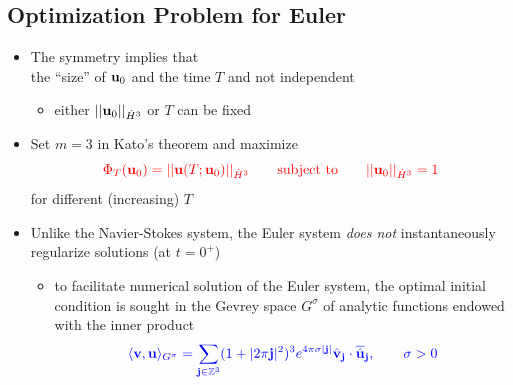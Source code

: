 \documentclass{beamer}
\def\Bmp#1{ \begin{minipage}{#1} }
\def\Emp{ \end{minipage} }
\def\red#1{{\color{red}{ #1 }}}
\def\blue#1{{\color{blue}{ #1 }}}
\def\v{{\bf v}}
\def\x{{\bf x}}
\def\j{{\bf j}}
\def\u{{\bf u}}
\begin{document}
\subsection{Optimization Problem for Euler}
\frame
{
  \hspace*{-0.75cm}
\Bmp{12cm}
\raggedright

\begin{itemize}
\item<1-> The symmetry
  \blue{$\lambda \u_\lambda(\lambda t, \x) = \u(t, \x)$,
    $\lambda \neq 0$} implies  that \\
  the ``size'' of $\u_0$ and the time $T$ and not independent 
 \begin{itemize}
 \item<2->
   either $||\u_0||_{\dot{H}^3}$ or $T$ can be fixed
 \end{itemize}
 
  \medskip
  
\item<3-> Set $m = 3$ in Kato's theorem and maximize
  \begin{equation*}
  \red{\Phi_T(\u_0) = ||\u(T;\u_0)||_{\dot{H}^3} \qquad \text{subject to} \qquad  ||\u_0||_{\dot{H}^3} = 1}
  \end{equation*}
for different (increasing) $T$

\bigskip
\item<4->
  Unlike the Navier-Stokes system, the Euler system {\em does not}
  instantaneously regularize solutions (at $t = 0^+$) 
  \begin{itemize}
  \item<5-> to facilitate numerical solution of the Euler system, the
    optimal initial condition is sought in the Gevrey space $G^\sigma$
    of analytic functions endowed with the inner product \\ \vspace*{-0.2cm}
    \begin{equation*}
\blue{\langle \v, \u\rangle_{G^\sigma} = \sum_{\j \in \mathbb Z^3} 
(1+|2\pi\j|^2)^3 e^{4\pi\sigma|\j|} \hat{\v}_{\j} \cdot
\overline{\hat{\u}}_{\j}, \qquad \sigma > 0}
\end{equation*}
  \end{itemize}
\end{itemize}

\Emp
}

\end{document}
